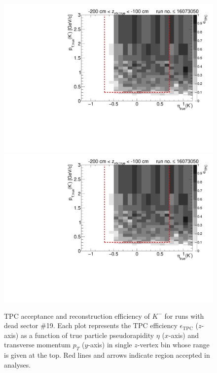 \begin{figure}[hb]
\caption[TPC acceptance and reconstruction efficiency of $K^{-}$ for runs with dead sector \#19.]{TPC acceptance and reconstruction efficiency of $K^{-}$ for runs with dead sector \#19. Each plot represents the TPC efficiency $\epsilon_{\text{TPC}}$ ($z$-axis) as a function of true particle pseudorapidity $\eta$ ($x$-axis) and transverse momentum $p_{T}$ ($y$-axis) in single $z$-vertex bin whose range is given at the top. Red lines and arrows indicate region accepted in analyses.}\label{fig:tpcEff_kaon_minus}
\centering
\parbox{0.495\textwidth}{
  \centering
  \includegraphics[width=\linewidth,page=3]{graphics/eff/Eff2D_TPC_kaon_Minus_RunRange1.pdf}\\
  \includegraphics[width=\linewidth,page=5]{graphics/eff/Eff2D_TPC_kaon_Minus_RunRange1.pdf}\\
}
\end{figure}
